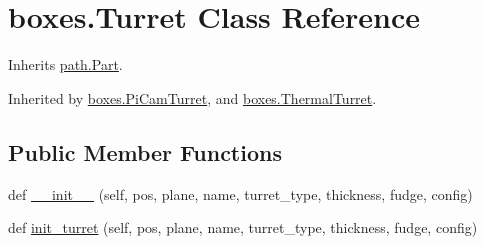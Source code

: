 \hypertarget{classboxes_1_1_turret}{}\section{boxes.\+Turret Class Reference}
\label{classboxes_1_1_turret}


Inherits \hyperlink{classpath_1_1_part}{path.\+Part}.



Inherited by \hyperlink{classboxes_1_1_pi_cam_turret}{boxes.\+Pi\+Cam\+Turret}, and \hyperlink{classboxes_1_1_thermal_turret}{boxes.\+Thermal\+Turret}.

\subsection*{Public Member Functions}
\begin{DoxyCompactItemize}
\item 
def \hyperlink{classboxes_1_1_turret_a61691e8112654e9fc0d7ea87ab8c7bc6}{\+\_\+\+\_\+init\+\_\+\+\_\+} (self, pos, plane, name, turret\+\_\+type, thickness, fudge, config)
\item 
def \hyperlink{classboxes_1_1_turret_a3e0f98b723433111372ab331e74ef168}{init\+\_\+turret} (self, pos, plane, name, turret\+\_\+type, thickness, fudge, config)
\end{DoxyCompactItemize}
